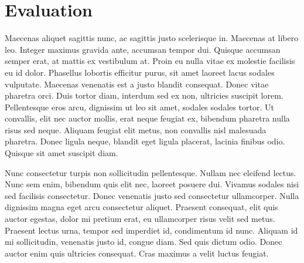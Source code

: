 \section{Evaluation}
\label{sec:evaluation}
Maecenas aliquet sagittis nunc, ac sagittis justo scelerisque in. Maecenas at libero leo. Integer maximus gravida ante, accumsan tempor dui. Quisque accumsan semper erat, at mattis ex vestibulum at. Proin eu nulla vitae ex molestie facilisis eu id dolor. Phasellus lobortis efficitur purus, sit amet laoreet lacus sodales vulputate. Maecenas venenatis est a justo blandit consequat. Donec vitae pharetra orci. Duis tortor diam, interdum sed ex non, ultricies suscipit lorem. Pellentesque eros arcu, dignissim ut leo sit amet, sodales sodales tortor. Ut convallis, elit nec auctor mollis, erat neque feugiat ex, bibendum pharetra nulla risus sed neque. Aliquam feugiat elit metus, non convallis nisl malesuada pharetra. Donec ligula neque, blandit eget ligula placerat, lacinia finibus odio. Quisque sit amet suscipit diam.

Nunc consectetur turpis non sollicitudin pellentesque. Nullam nec eleifend lectus. Nunc sem enim, bibendum quis elit nec, laoreet posuere dui. Vivamus sodales nisi sed facilisis consectetur. Donec venenatis justo sed consectetur ullamcorper. Nulla dignissim magna eget arcu consectetur aliquet. Praesent consequat, elit quis auctor egestas, dolor mi pretium erat, eu ullamcorper risus velit sed metus. Praesent lectus urna, tempor sed imperdiet id, condimentum id nunc. Aliquam id mi sollicitudin, venenatis justo id, congue diam. Sed quis dictum odio. Donec auctor enim quis ultricies consequat. Cras maximus a velit luctus feugiat.

